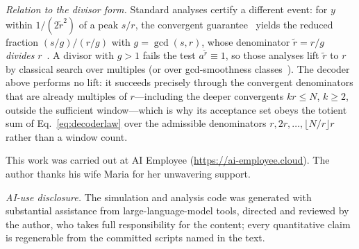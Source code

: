 \documentclass[aps,pra,reprint,superscriptaddress,nofootinbib,floatfix]{revtex4-2}
\begin{document}
\emph{Relation to the divisor form.} Standard analyses certify a
different event: for $y$ within $1/(2\tilde r^{2})$ of a peak $s/r$,
the convergent guarantee~\cite{hardy2008} yields the reduced fraction
$(s/g)/(r/g)$ with $g=\gcd(s,r)$, whose denominator $\tilde r=r/g$
\emph{divides} $r$~\cite{shor1997,ekera2024}. A divisor with $g>1$
fails the test $a^{\tilde r}\equiv1$, so those analyses lift $\tilde
r$ to $r$ by classical search over multiples (or over
gcd-smoothness classes~\cite{ekera2024}). The decoder above performs
no lift: it succeeds precisely through the convergent denominators
that are already multiples of $r$---including the deeper convergents
$kr\le N$, $k\ge2$, outside the sufficient window---which is why its
acceptance set obeys the totient sum of Eq.~\eqref{eq:decoderlaw}
over the admissible denominators $r,2r,\dots,\lfloor N/r\rfloor r$
rather than a window count.

\begin{acknowledgments}
This work was carried out at AI Employee
(\url{https://ai-employee.cloud}). The author thanks his wife Maria for
her unwavering support.
\end{acknowledgments}

\emph{AI-use disclosure.} The simulation and analysis code
was generated with substantial assistance from
large-language-model tools, directed and reviewed
by the author, who takes full responsibility for the content; every
quantitative claim is regenerable from the committed scripts named in
the text.


\end{document}
